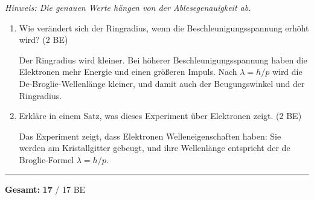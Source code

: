 \documentclass[11pt,a4paper]{article}
\begin{document}
\vspace{0.3em}
{\small\textit{Hinweis: Die genauen Werte hängen von der Ablesegenauigkeit ab.}}

\vspace{0.8em}

\begin{enumerate}[label=\alph*)]
\item Wie verändert sich der Ringradius, wenn die Beschleunigungsspannung erhöht wird? \hfill (2 BE)

\textcolor{loesung}{Der Ringradius wird kleiner. Bei höherer Beschleunigungsspannung haben die Elektronen mehr Energie und einen größeren Impuls. Nach $\lambda = h/p$ wird die De-Broglie-Wellenlänge kleiner, und damit auch der Beugungswinkel und der Ringradius.}

\vspace{0.3em}

\item Erkläre in einem Satz, was dieses Experiment über Elektronen zeigt. \hfill (2 BE)

\textcolor{loesung}{Das Experiment zeigt, dass Elektronen Welleneigenschaften haben: Sie werden am Kristallgitter gebeugt, und ihre Wellenlänge entspricht der de Broglie-Formel $\lambda = h/p$.}

\end{enumerate}

\vspace{1em}

\begin{center}
\rule{10cm}{0.5pt}

\textbf{Gesamt:} \textcolor{loesung}{\textbf{17}} / 17 BE
\end{center}
\end{document}
